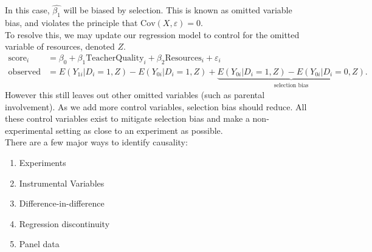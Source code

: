 \documentclass[10pt]{extarticle}
\begin{document}
  In this case, $\hat{\beta_1}$ will be biased by selection. This is known as omitted variable bias, and violates the principle that $\text{Cov}(X,\varepsilon) = 0$.\\

  To resolve this, we may update our regression model to control for the omitted variable of resources, denoted $Z$.
  \begin{align*}
    \text{score}_{i} &= \beta_0 + \beta_1\text{TeacherQuality}_i + \beta_2\text{Resources}_i + \varepsilon_i\\
    \text{observed effect} &= E(Y_{1i}|D_i=1,Z) - E(Y_{0i}|D_{i}=1,Z) + \underbrace{E(Y_{0i}|D_i=1,Z) - E(Y_{0i}|D_i=0,Z)}_{\text{selection bias}}.
  \end{align*}
  However this still leaves out other omitted variables (such as parental involvement). As we add more control variables, selection bias should reduce. All these control variables exist to mitigate selection bias and make a non-experimental setting as close to an experiment as possible.\\

  There are a few major ways to identify causality:
  \begin{enumerate}[(1)]
    \item Experiments
    \item Instrumental Variables
    \item Difference-in-difference
    \item Regression discontinuity
    \item Panel data
  \end{enumerate}
\end{document}

